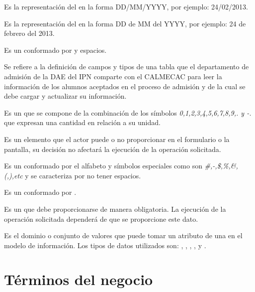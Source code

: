 \begin{bGlosario}
	 Es la representación del   en la forma DD/MM/YYYY, por ejemplo: 24/02/2013.
	
	 Es la representación del   en la forma DD de MM del YYYY, por ejemplo: 24 de febrero del 2013.
	
	 Es un  conformado por  y espacios.
	
	 Se refiere a la definición de campos y tipos de una tabla que el departamento de admisión de la DAE del IPN comparte con el CALMECAC para leer la información de los alumnos aceptados en el proceso de admisión y de la cual se debe cargar y actualizar su información.
	
	
	 Es un  que se compone de la combinación de los símbolos \textit{0,1,2,3,4,5,6,7,8,9,. y -.}  que expresan una cantidad en relación a su unidad.
	
	 Es un elemento que el actor puede o no proporcionar en el formulario o la pantalla, su decisión no afectará la ejecución de la operación solicitada.
	
	 Es un   conformado por el alfabeto y símbolos especiales como son \textit{\#,-,\$,\%,\&,(,),etc} y se caracteriza por no tener espacios.
	
	 Es un  conformado por .
	
	 Es un  que debe proporcionarse de manera obligatoria. La ejecución de la operación solicitada dependerá de que se proporcione este dato.
	
	 Es el dominio o conjunto de valores que puede tomar un atributo de una  en el modelo de información. Los tipos de datos utilizados son: , , , ,  y .
	
\end{bGlosario}

\section{Términos del negocio}

